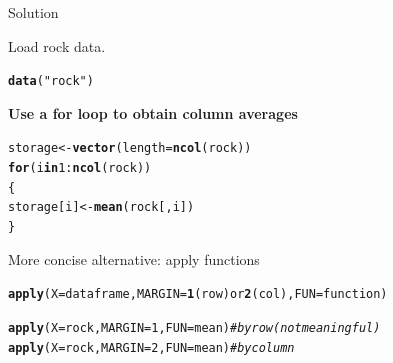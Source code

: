 \documentclass[10pt]{beamer}\usepackage[]{graphicx}\usepackage[]{color}
\makeatletter
\newcommand{\hlnum}[1]{\textcolor[rgb]{0.686,0.059,0.569}{#1}}%
\newcommand{\hlstr}[1]{\textcolor[rgb]{0.192,0.494,0.8}{#1}}%
\newcommand{\hlcom}[1]{\textcolor[rgb]{0.678,0.584,0.686}{\textit{#1}}}%
\newcommand{\hlopt}[1]{\textcolor[rgb]{0,0,0}{#1}}%
\newcommand{\hlstd}[1]{\textcolor[rgb]{0.345,0.345,0.345}{#1}}%
\newcommand{\hlkwa}[1]{\textcolor[rgb]{0.161,0.373,0.58}{\textbf{#1}}}%
\newcommand{\hlkwb}[1]{\textcolor[rgb]{0.69,0.353,0.396}{#1}}%
\newcommand{\hlkwc}[1]{\textcolor[rgb]{0.333,0.667,0.333}{#1}}%
\newcommand{\hlkwd}[1]{\textcolor[rgb]{0.737,0.353,0.396}{\textbf{#1}}}%
\newenvironment{kframe}{%
 \def\at@end@of@kframe{}%
 \ifinner\ifhmode%
  \def\at@end@of@kframe{\end{minipage}}%
  \begin{minipage}{\columnwidth}%
 \fi\fi%
 \def\FrameCommand##1{\hskip\@totalleftmargin \hskip-\fboxsep
 \colorbox{shadecolor}{##1}\hskip-\fboxsep
     \hskip-\linewidth \hskip-\@totalleftmargin \hskip\columnwidth}%
 \MakeFramed {\advance\hsize-\width
   \@totalleftmargin\z@ \linewidth\hsize
   \@setminipage}}%
 {\par\unskip\endMakeFramed%
 \at@end@of@kframe}
\newenvironment{knitrout}{}{} %
\makeatother
\begin{document}
\begin{frame}[fragile]{Solution}

Load rock data.
\begin{knitrout}
\color{fgcolor}\begin{kframe}
\begin{alltt}
  \hlkwd{data}\hlstd{(}\hlstr{"rock"}\hlstd{)}
\end{alltt}
\end{kframe}
\end{knitrout}
  
  \centering
\textbf{\large Use a for loop to obtain column averages}
  
\begin{knitrout}
\color{fgcolor}\begin{kframe}
\begin{alltt}
  \hlstd{storage} \hlkwb{<-} \hlkwd{vector}\hlstd{(}\hlkwc{length} \hlstd{=} \hlkwd{ncol}\hlstd{(rock))}
  \hlkwa{for} \hlstd{(i} \hlkwa{in} \hlnum{1}\hlopt{:}\hlkwd{ncol}\hlstd{(rock))}
  \hlstd{\{}
    \hlstd{storage[i]} \hlkwb{<-} \hlkwd{mean}\hlstd{(rock[,i])}
  \hlstd{\}}
\end{alltt}
\end{kframe}
\end{knitrout}
\end{frame}
\begin{frame}[fragile]{More concise alternative: apply functions}

\begin{knitrout}
\color{fgcolor}\begin{kframe}
\begin{alltt}
\hlkwd{apply}(X = dataframe, MARGIN = \hlkwd{1} (row) or \hlkwd{2} (col), FUN = function)
\end{alltt}
\end{kframe}
\end{knitrout}
  
  \pause
  
\begin{knitrout}
\color{fgcolor}\begin{kframe}
\begin{alltt}
\hlkwd{apply}\hlstd{(}\hlkwc{X} \hlstd{= rock,} \hlkwc{MARGIN} \hlstd{=} \hlnum{1}\hlstd{,} \hlkwc{FUN} \hlstd{= mean)}\hlcom{#by row (not meaningful)}
\hlkwd{apply}\hlstd{(}\hlkwc{X} \hlstd{= rock,} \hlkwc{MARGIN} \hlstd{=} \hlnum{2}\hlstd{,} \hlkwc{FUN} \hlstd{= mean)}\hlcom{#by column}
\end{alltt}
\end{kframe}
\end{knitrout}
\end{frame}
\end{document}
